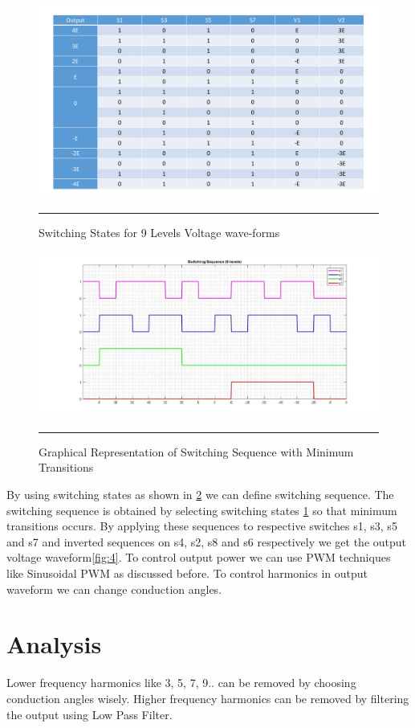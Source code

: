 \begin{figure}[htbp]
	\centering
		\includegraphics[width = 6in]{./Figures/SWITCH.pdf}
		\rule{35em}{5pt}
	\caption{Switching States for 9 Levels Voltage wave-forms}
	\label{fig:2}
\end{figure}
\begin{figure}[htbp]
	\centering
		\includegraphics[width = 6in]{./Figures/graph.pdf}
		\rule{35em}{5pt}
	\caption{Graphical Representation of Switching Sequence with Minimum Transitions}
	\label{fig:3}
\end{figure}
By using switching states as shown in \ref{fig:3} we can define switching sequence.
The switching sequence is obtained by selecting switching states \ref{fig:2} so that minimum transitions occurs. 
By applying these sequences to respective switches s1, s3, s5 and s7 and inverted sequences on s4, s2, s8 and s6 respectively we get the output voltage waveform\ref{fig:4}.
To control output power we can use PWM techniques like Sinusoidal PWM as discussed before.
To control harmonics in output waveform we can change conduction angles.
\section{Analysis}
Lower frequency harmonics like 3, 5, 7, 9.. can be removed by choosing conduction angles wisely.
Higher frequency harmonics can be removed by filtering the output using Low Pass Filter.

